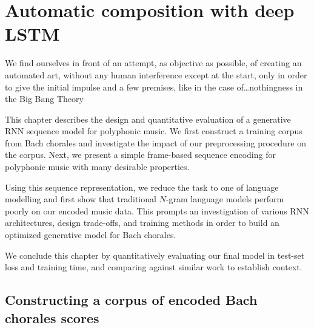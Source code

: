 \chapter{Automatic composition with deep LSTM}
\begin{savequote}[75mm]
  We find ourselves in front of an attempt, as objective as possible, of creating
  an automated art, without any human interference except at the start, only in
  order to give the initial impulse and a few premises, like in the case
  of\ldots nothingness in the Big Bang Theory
\end{savequote}
\ifpdf
    \graphicspath{{Chapter4/Figs/Raster/}{Chapter4/Figs/PDF/}{Chapter4/Figs/}}
\else
    \graphicspath{{Chapter4/Figs/Vector/}{Chapter4/Figs/}}
\fi

This chapter describes the design and quantitative evaluation of a generative
RNN sequence model for polyphonic music. We first construct a training corpus
from Bach chorales and investigate the impact of our preprocessing procedure on
the corpus. Next, we present a simple frame-based sequence encoding for
polyphonic music with many desirable properties.

Using this sequence representation, we reduce the task to one of language
modelling and first show that traditional $N$-gram language models perform poorly
on our encoded music data. This prompts an investigation of various RNN
architectures, design trade-offs, and training methods in order to build
an optimized generative model for Bach chorales.

We conclude this chapter by quantitatively evaluating our final model in
test-set loss and training time, and comparing against similar work to
establish context.

\section{Constructing a corpus of encoded Bach chorales scores}


